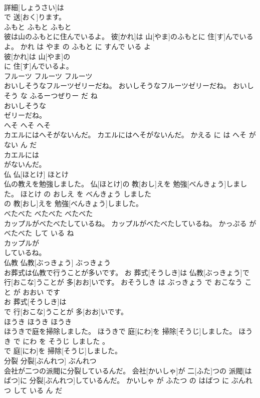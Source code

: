 \documentclass[8pt]{extreport}
\begin{document}
\begin{CJK}{UTF8}{min}
\\	詳細[しょうさい]は
\\	で 送[おく]ります。			
\\	ふもと	ふもと	ふもと	
\\	彼は山のふもとに住んでいるよ。	彼[かれ]は 山[やま]のふもとに 住[す]んでいるよ。	かれ は やま の ふもと に すんで いる よ	
\\	彼[かれ]は 山[やま]の
\\	に 住[す]んでいるよ。			
\\	フルーツ	フルーツ	フルーツ	
\\	おいしそうなフルーツゼリーだね。	おいしそうなフルーツゼリーだね。	おいし そう な ふるーつぜりー だ ね	
\\	おいしそうな
\\	ゼリーだね。			
\\	へそ	へそ	へそ	
\\	カエルにはへそがないんだ。	カエルにはへそがないんだ。	かえる に は へそ が ない ん だ	
\\	カエルには
\\	がないんだ。			
\\	仏	仏[ほとけ]	ほとけ	
\\	仏の教えを勉強しました。	仏[ほとけ]の 教[おし]えを 勉強[べんきょう]しました。	ほとけ の おしえ を べんきょう しました	
\\	の 教[おし]えを 勉強[べんきょう]しました。			
\\	べたべた	べたべた	べたべた	
\\	カップルがべたべたしているね。	カップルがべたべたしているね。	かっぷる が べたべた して いる ね	
\\	カップルが
\\	しているね。			
\\	仏教	仏教[ぶっきょう]	ぶっきょう	
\\	お葬式は仏教で行うことが多いです。	お 葬式[そうしき]は 仏教[ぶっきょう]で 行[おこな]うことが 多[おお]いです。	おそうしき は ぶっきょう で おこなう こと が おおい です	
\\	お 葬式[そうしき]は
\\	で 行[おこな]うことが 多[おお]いです。			
\\	ほうき	ほうき	ほうき	
\\	ほうきで庭を掃除しました。	ほうきで 庭[にわ]を 掃除[そうじ]しました。	ほうき で にわ を そうじ しました 。	
\\	で 庭[にわ]を 掃除[そうじ]しました。			
\\	分裂	分裂[ぶんれつ]	ぶんれつ	
\\	会社が二つの派閥に分裂しているんだ。	会社[かいしゃ]が 二[ふた]つの 派閥[はばつ]に 分裂[ぶんれつ]しているんだ。	かいしゃ が ふたつ の はばつ に ぶんれつ して いる ん だ	

\end{CJK}
\end{document}
